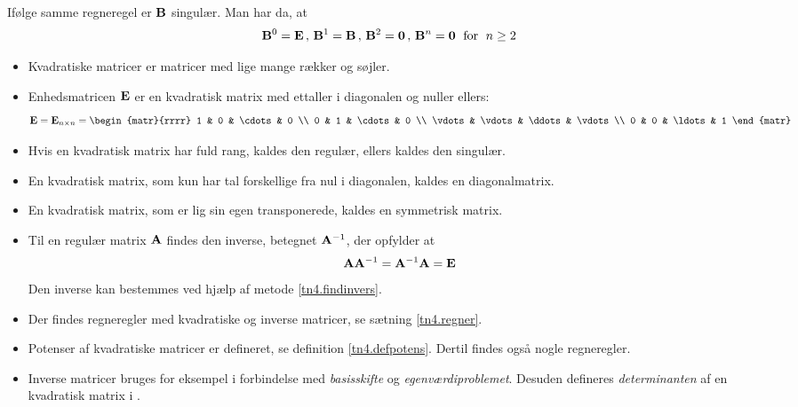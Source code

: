 \begin{example}
\begin{equation}
\end{equation}
Ifølge samme regneregel er $ \mathbf{B} $ singulær. Man har da, at
\begin{equation}
\mathbf{B}^0 = \mathbf{E} \, , \, \mathbf{B}^1 = \mathbf{B} \, , \, \mathbf{B}^2 = \bm{0} \, , \, \mathbf{B}^n = \bm{0} \; \mathrm{~for~} \; n \geq 2
\end{equation}
\end{example}

\begin{summary}
\begin{itemize}
\item Kvadratiske matricer er matricer med lige mange rækker og søjler.
\item Enhedsmatricen $ \mathbf{E} $ er en kvadratisk matrix med ettaller i diagonalen og nuller ellers:
\begin{equation}
\mE = \mE_{n \times n} = \begin{matr}{rrrr} 1 & 0 & \cdots & 0 \\ 0 & 1 & \cdots & 0 \\ \vdots & \vdots & \ddots & \vdots \\ 0 & 0 & \ldots & 1 \end{matr}
\end{equation}
\item Hvis en kvadratisk matrix har fuld rang, kaldes den regulær, ellers kaldes den singulær.
\item En kvadratisk matrix, som kun har tal forskellige fra nul i diagonalen, kaldes en diagonalmatrix.
\item En kvadratisk matrix, som er lig sin egen transponerede, kaldes en symmetrisk matrix.
\item Til en regulær matrix $ \mathbf{A} $ findes den inverse, betegnet $ \mathbf{A}^{-1} $, der opfylder at
\begin{equation}
\mathbf{A}\mathbf{A}^{-1} = \mathbf{A}^{-1}\mathbf{A} = \mathbf{E}
\end{equation}
Den inverse kan bestemmes ved hjælp af metode \ref{tn4.findinvers}.
\item Der findes regneregler med kvadratiske og inverse matricer, se sætning \ref{tn4.regner}.
\item Potenser af kvadratiske matricer er defineret, se definition \ref{tn4.defpotens}. Dertil findes også nogle regneregler.
\item Inverse matricer bruges for eksempel i forbindelse med \textit{basisskifte} og \textit{egenværdiproblemet}. Desuden defineres \textit{determinanten} af en kvadratisk matrix i .
\end{itemize}
\end{summary}


